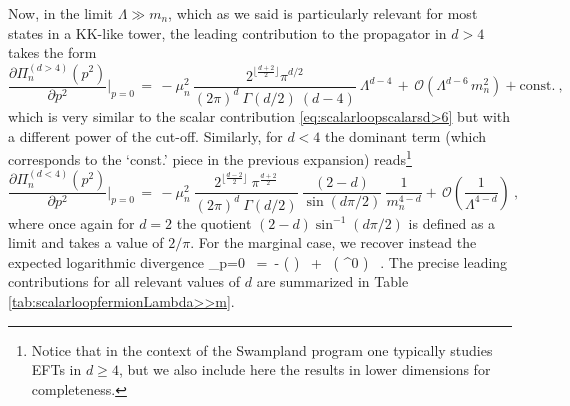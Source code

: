 %
Now, in the limit $\Lambda \gg m_n$, which as we said is particularly relevant for most states in a KK-like tower, the leading contribution to the propagator in $d>4$ takes the form
%
\begin{equation}
			\frac {\partial \Pi_n^{(d>4)}(p^2)}{\partial p^2} \bigg\rvert_{p=0}\, = \, -\mu_n^2\,  \frac{2^{\lfloor \frac{d+2}{2} \rfloor} \pi^{d/2}}{(2 \pi)^d\ \Gamma\left( d/2 \right) \ (d-4)}   \ \Lambda^{d-4} \, + \, \mathcal{O}\left(\Lambda^{d-6}\, m_n^2\right) + \mathrm{const.} \ ,
			\label{eq:scalarloopfermionsd>4}
\end{equation}
%
which is very similar to the scalar contribution \eqref{eq:scalarloopscalarsd>6} but with a different power of the cut-off. Similarly, for $d<4$ the dominant term (which corresponds to the `const.' piece in the previous expansion) reads\footnote{Notice that in the context of the Swampland program one typically studies EFTs in $d\geq 4$, but we also include here the results in lower dimensions for completeness.}
%
\begin{equation}
			\frac {\partial \Pi_n^{(d<4)}(p^2)}{\partial p^2} \bigg\rvert_{p=0}\, = \, - \mu_n^2 \ \frac{2^{\lfloor\frac{d-2}{2} \rfloor} \ \pi^{\frac{d+2}{2}} }{(2 \pi)^d  \ \Gamma\left( d/2 \right)} \ \frac{(2-d)}{\sin\left( d \pi/2\right)} \ \frac{1}{m_n^{4-d}} + \, \mathcal{O}\left(\frac{1}{\Lambda^{4-d}}\right)  \ ,
\label{eq:scalarloopfermionsd<4}
\end{equation}
%
where once again for $d=2$ the quotient $(2-d) \sin^{-1}\left( d \pi/2\right)$ is defined as a limit and takes a value of $2/ \pi$. For the marginal case, we recover instead the expected logarithmic divergence
%
\beq
		 \bigg\rvert_{p=0} \, =\, -  \log \left(  \right) \ + \ \left( \Lambda^0 \right)  \, .
\label{eq:scalarloopfermionsd=6}
\eeq
%
The precise leading contributions for all relevant values of $d$ are summarized in Table \ref{tab:scalarloopfermionLambda>>m}.
		
